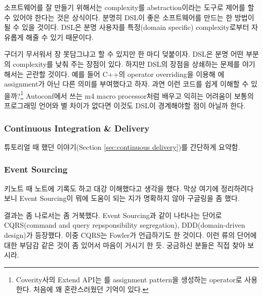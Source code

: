 \documentclass[11pt]{article}
\begin{document}
소프트웨어를 잘 만들기 위해서는 complexity를 abstraction이라는 도구로
제어를 할 수 있어야 한다는 것은 상식이다. 분명히 DSL이 좋은 
소프트웨어를 만드는 한 방법이 될 수 있을 것이다. DSL은 분명 사용자를
특정(domain specific) complexity로부터 자유롭게 해줄 수 있기 때문이다.

 
구더기 무서워서 장 못담그냐고 할 수 있지만 한 마디 덪붙이자. DSL은 분명
어떤 부분의 complexity를 낮춰 주는 장점이 있다. 하지만  DSL의 장점을 상쇄하는
문제를 야기해서는 곤란할 것이다. 예를 들어 C++의 operator overriding을 이용해 
\mbtt{=}에 assignment가 아닌 다른 의미를 부여했다고 하자. 과연 이런 코드를 쉽게 
이해할 수 있을까?\footnote{Coverity사의 Extend API는 \mbtt{=}를 assignment
pattern을 생성하는 operator로 사용한다. 처음에 꽤 혼란스러웠던 기억이 있다.}
Autoconf에서 쓰는 m4 macro processor처럼 배우고 익히는 어려움이 보통의 
프로그래밍 언어와 별 차이가 없다면 이것도 DSL이 경계해야할 점이 아닐까 한다.

\subsubsection{Continuous Integration \& Delivery}
 
튜토리얼 때 했던 이야기(Section \ref{sec:continuous delivery})를 간단하게 
요약함.  

% 
 
\subsubsection{Event Sourcing}

키노트 때 노트에 기록도 하고 대강 이해했다고 생각을 했다. 막상 여기에
정리하려다 보니 Event Sourcing이 뭐에 도움이 되는 지가 명확하지 않아
구글링을 좀 했다.
 
결과는 좀 나로서는 좀 거북했다. Event Sourcing과 같이 나타나는 단어로
CQRS(command and query repsponsibility segregation), DDD(domain-driven
design)가 등장했다. 이중 CQRS는 Fowler가 언급하기도 한 것이다. 이런
류의 단어에 대한 부담감 같은 것이 좀 있어서 마음이 거시기 한
듯. 궁금하신 분들은 직접 찾아 보시라.
 
\end{document}
